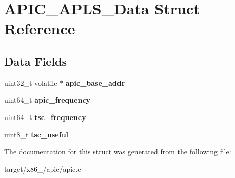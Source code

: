 \hypertarget{structAPIC__APLS__Data}{}\section{A\+P\+I\+C\+\_\+\+A\+P\+L\+S\+\_\+\+Data Struct Reference}
\label{structAPIC__APLS__Data}
\subsection*{Data Fields}
\begin{DoxyCompactItemize}
\item 
uint32\+\_\+t volatile $\ast$ {\bfseries apic\+\_\+base\+\_\+addr}\hypertarget{structAPIC__APLS__Data_a7df8f612cb6a4a77e87291384faec31b}{}\label{structAPIC__APLS__Data_a7df8f612cb6a4a77e87291384faec31b}

\item 
uint64\+\_\+t {\bfseries apic\+\_\+frequency}\hypertarget{structAPIC__APLS__Data_a0aead17f6b635e829a83cd3d22651698}{}\label{structAPIC__APLS__Data_a0aead17f6b635e829a83cd3d22651698}

\item 
uint64\+\_\+t {\bfseries tsc\+\_\+frequency}\hypertarget{structAPIC__APLS__Data_adcd752461c67ad3111588f549937adb4}{}\label{structAPIC__APLS__Data_adcd752461c67ad3111588f549937adb4}

\item 
uint8\+\_\+t {\bfseries tsc\+\_\+useful}\hypertarget{structAPIC__APLS__Data_a1960bb58f15fcfbd944c48e7abb42c3c}{}\label{structAPIC__APLS__Data_a1960bb58f15fcfbd944c48e7abb42c3c}

\end{DoxyCompactItemize}


The documentation for this struct was generated from the following file\+:\begin{DoxyCompactItemize}
\item 
target/x86\+\_/apic/apic.\+c\end{DoxyCompactItemize}
